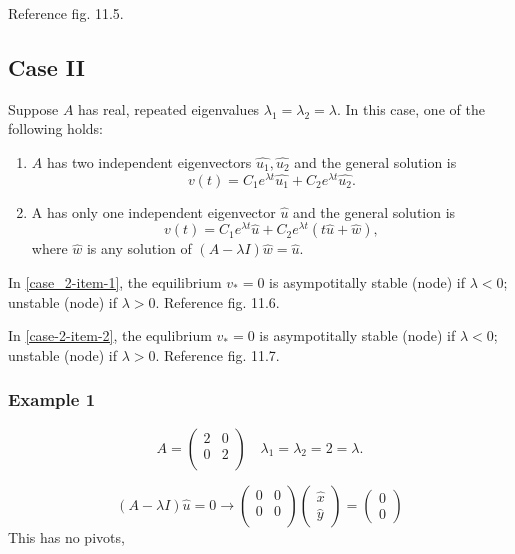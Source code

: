 \documentclass[12pt]{article}
\begin{document}
Reference fig. 11.5.

\subsection{Case II}
Suppose $A$ has real, repeated eigenvalues $\lambda_1=\lambda_2=\lambda$. In
this case, one of the following holds:
\begin{enumerate}
\item $A$ has two independent eigenvectors $\hat{u_1}, \hat{u_2}$ and the
  general solution is
$$v(t)=C_1e^{\lambda t}\hat{u_1}+C_2e^{\lambda t}\hat{u_2}.$$
\label{itm:case-2-item-1}
\item A has only one independent eigenvector $\hat{u}$ and the general solution
  is $$v(t)=C_1e^{\lambda t}\hat{u}+C_2e^{\lambda t}(t\hat{u}+\hat{w}),$$ where
  $\hat{w}$ is any solution of $(A-\lambda I)\hat{w}=\hat{u}$.
\label{itm:case-2-item-2}
\end{enumerate}

In \cref{case_2-item-1}, the equilibrium $v_*=0$ is asympotitally stable (node)
if $\lambda<0$; unstable (node) if $\lambda>0$. Reference fig. 11.6.

In \cref{case-2-item-2}, the equlibrium $v_*=0$ is asympotitally stable (node)
if $\lambda<0$; unstable (node) if $\lambda>0$. Reference fig. 11.7.

\subsubsection{Example 1}
\begin{equation}
  A =
  \begin{pmatrix}
    2 & 0 \\ 0 & 2 \\
  \end{pmatrix}
\quad \lambda_1 = \lambda_2 = 2 = \lambda.
\end{equation}

\begin{equation}
  (A-\lambda I)\hat{u}=0 \longrightarrow
  \begin{pmatrix}
    0 & 0 \\ 0 & 0 \\
  \end{pmatrix}
  \begin{pmatrix}
    \hat{x} \\ \hat{y}
  \end{pmatrix} =
  \begin{pmatrix}
    0 \\ 0
  \end{pmatrix}
\end{equation}
This has no pivots, 
\end{document}
